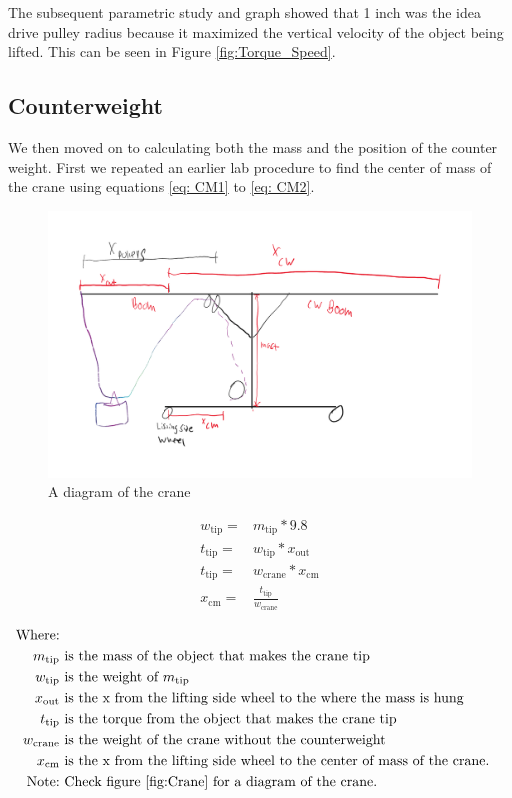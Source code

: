\documentclass[letterpaper, 12pt]{article}
\begin{document}
The subsequent parametric study and graph showed that 1 inch was the idea drive pulley radius because it maximized the vertical velocity of the object being lifted.  This can be seen in Figure \ref{fig:Torque_Speed}.

\subsection{Counterweight}
\label{sec:Counterweight}
We then moved on to calculating both the mass and the position of the counter weight. 
First we repeated an earlier lab procedure to find the center of mass of the crane using equations \ref{eq: CM1} to \ref{eq: CM2}.
\begin{figure}[H]
    \centering
    \includegraphics[width =0.6\linewidth]{null (3).png}
    \caption{A diagram of the crane}
    \label{fig:Crane}
\end{figure}

\begin{align}
        w_{\text{tip}}= & m_{\text{tip}} * 9.8 \label{eq: CM1} \\ 
        t_{\text{tip}}= & w_{\text{tip}}*x_{\text{out}}\label{eq:Torque 1} \\ 
        t_{\text{tip}}= & w_{\text{crane}}*x_{\text{cm}}\label{eq:Torque 2} \\
        x_{\text{cm}}= & \frac{t_{\text{tip}}}{w_{\text{crane}}} \label{eq: CM2}
\end{align}

\begin{equation}
    \begin{split}
        \text{Where:} \\
        m_{\text{tip}} & \text{ is the mass of the object that makes the crane tip} \\
        w_{\text{tip}} & \text{ is the weight of } m_{\text{tip}} \\
        x_{\text{out}} & \text{ is the x from the lifting side wheel to the where the mass is hung} \\
        t_{\text{tip}} & \text{ is the torque from the object that makes the crane tip} \\
        w_{\text{crane}} & \text{ is the weight of the crane without the counterweight} \\
        x_{\text{cm}} & \text{ is the x from the lifting side wheel to the center of mass of the crane.} \\
        \text{Note:} & \text{ Check figure \ref{fig:Crane} for a diagram of the crane.}
    \end{split}
\end{equation}
\end{document}
